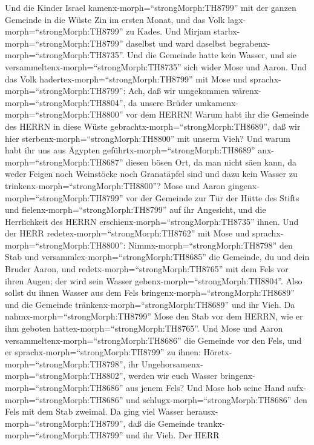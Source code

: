  Und die Kinder Israel kamenx-morph=``strongMorph:TH8799''
mit der ganzen Gemeinde in die Wüste Zin im ersten Monat, und das Volk
lagx-morph=``strongMorph:TH8799'' zu Kades. Und Mirjam
starbx-morph=``strongMorph:TH8799'' daselbst und ward daselbst
begrabenx-morph=``strongMorph:TH8735''.  Und die Gemeinde
hatte kein Wasser, und sie versammeltenx-morph=``strongMorph:TH8735''
sich wider Mose und Aaron.  Und das Volk
hadertex-morph=``strongMorph:TH8799'' mit Mose und
sprachx-morph=``strongMorph:TH8799'': Ach, daß wir umgekommen
wärenx-morph=``strongMorph:TH8804'', da unsere Brüder
umkamenx-morph=``strongMorph:TH8800'' vor dem HERRN!  Warum
habt ihr die Gemeinde des HERRN in diese Wüste
gebrachtx-morph=``strongMorph:TH8689'', daß wir hier
sterbenx-morph=``strongMorph:TH8800'' mit unserm Vieh?  Und
warum habt ihr uns aus Ägypten geführtx-morph=``strongMorph:TH8689''
anx-morph=``strongMorph:TH8687'' diesen bösen Ort, da man nicht säen
kann, da weder Feigen noch Weinstöcke noch Granatäpfel sind und dazu
kein Wasser zu trinkenx-morph=``strongMorph:TH8800''?  Mose
und Aaron gingenx-morph=``strongMorph:TH8799'' vor der Gemeinde zur Tür
der Hütte des Stifts und fielenx-morph=``strongMorph:TH8799'' auf ihr
Angesicht, und die Herrlichkeit des HERRN
erschienx-morph=``strongMorph:TH8735'' ihnen.  Und der HERR
redetex-morph=``strongMorph:TH8762'' mit Mose und
sprachx-morph=``strongMorph:TH8800'': 
Nimmx-morph=``strongMorph:TH8798'' den Stab und
versammlex-morph=``strongMorph:TH8685'' die Gemeinde, du und dein Bruder
Aaron, und redetx-morph=``strongMorph:TH8765'' mit dem Fels vor ihren
Augen; der wird sein Wasser gebenx-morph=``strongMorph:TH8804''. Also
sollst du ihnen Wasser aus dem Fels
bringenx-morph=``strongMorph:TH8689'' und die Gemeinde
tränkenx-morph=``strongMorph:TH8689'' und ihr Vieh.  Da
nahmx-morph=``strongMorph:TH8799'' Mose den Stab vor dem HERRN, wie er
ihm geboten hattex-morph=``strongMorph:TH8765''.  Und Mose
und Aaron versammeltenx-morph=``strongMorph:TH8686'' die Gemeinde vor
den Fels, und er sprachx-morph=``strongMorph:TH8799'' zu ihnen:
Höretx-morph=``strongMorph:TH8798'', ihr
Ungehorsamenx-morph=``strongMorph:TH8802'', werden wir euch Wasser
bringenx-morph=``strongMorph:TH8686'' aus jenem Fels?  Und
Mose hob seine Hand aufx-morph=``strongMorph:TH8686'' und
schlugx-morph=``strongMorph:TH8686'' den Fels mit dem Stab zweimal. Da
ging viel Wasser herausx-morph=``strongMorph:TH8799'', daß die Gemeinde
trankx-morph=``strongMorph:TH8799'' und ihr Vieh.  Der HERR
